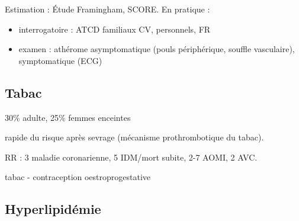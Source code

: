 \documentclass[11pt]{article}
\begin{document}
Estimation : Étude Framingham, SCORE. En pratique : 
\begin{itemize}
\item interrogatoire  : ATCD familiaux CV, personnels, FR
\item examen : athérome asymptomatique (pouls périphérique, souffle vasculaire),
symptomatique (ECG)
\end{itemize}

\subsection{Tabac}
\label{sec:org853e8e5}
30\% adulte, 25\% femmes enceintes

\inc rapide du risque après sevrage (mécanisme prothrombotique du tabac). 

RR : 3 maladie coronarienne, 5 IDM/mort subite, 2-7 AOMI, 2 AVC.

\danger tabac - contraception oestroprogestative

\subsection{Hyperlipidémie}
\label{sec:org7da89f9}
\end{document}
